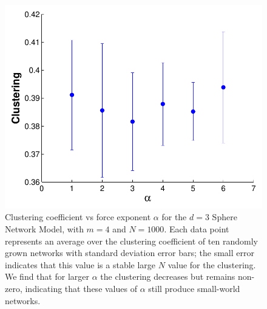 \documentclass[aps,pre,reprint,superscriptaddress,amsmath,amssymb,nofootinbib]{revtex4-1}
\begin{document}
\begin{figure}
\includegraphics[width=\linewidth]{figures/figCvsAlpha.pdf}
\caption{\label{forcelaw}Clustering coefficient vs force exponent $\alpha$ for the $d = 3$ Sphere Network Model, with $m = 4$ and $N = 1000$. Each data point represents an average over the clustering coefficient of ten randomly grown networks with standard deviation error bars; the small error indicates that this value is a stable large $N$ value for the clustering. We find that for larger $\alpha$ the clustering decreases but remains non-zero, indicating that these values of $\alpha$ still produce small-world networks.}
\end{figure}

\nocite{newmanreview}

\end{document}

